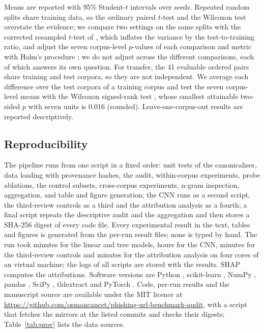 Means are reported with 95\% Student-$t$ intervals over seeds. Repeated random splits share training data, so the ordinary paired $t$-test and the Wilcoxon test overstate the evidence; we compare two settings on the same splits with the corrected resampled $t$-test of \citet{nadeau2003}, which inflates the variance by the test-to-training ratio, and adjust the seven corpus-level $p$-values of each comparison and metric with Holm's procedure \citep{holm1979,demsar2006}; we do not adjust across the different comparisons, each of which answers its own question. For transfer, the 41 evaluable ordered pairs share training and test corpora, so they are not independent. We average each difference over the test corpora of a training corpus and test the seven corpus-level means with the Wilcoxon signed-rank test \citep{wilcoxon1945}, whose smallest attainable two-sided $p$ with seven units is 0.016 (rounded). Leave-one-corpus-out results are reported descriptively.

\subsection{Reproducibility}
\label{sec:repro}
The pipeline runs from one script in a fixed order: unit tests of the canonicaliser, data loading with provenance hashes, the audit, within-corpus experiments, probe ablations, the control subsets, cross-corpus experiments, n-gram inspection, aggregation, and table and figure generation; the CNN runs as a second script, the third-review controls as a third and the attribution analysis as a fourth; a final script repeats the descriptive audit and the aggregation and then stores a SHA-256 digest of every code file. Every experimental result in the text, tables and figures is generated from the per-run result files; none is typed by hand. The run took \RunMinutes{} minutes for the linear and tree models, \CNNHours{} hours for the CNN, \RThreeMinutes{} minutes for the third-review controls and \ShapMinutes{} minutes for the attribution analysis on four cores of an \VerCpu{} virtual machine; the logs of all scripts are stored with the results. SHAP \VerShap{} computes the attributions. Software versions are Python \VerPython{}, scikit-learn \VerSklearn{}, NumPy \VerNumpy{}, pandas \VerPandas{}, SciPy \VerScipy{}, tldextract \VerTldextract{} and PyTorch \VerTorch{}. Code, per-run results and the manuscript source are available under the MIT licence at \url{https://github.com/osmancancet/phishing-url-benchmark-audit}, with a script that fetches the mirrors at the listed commits and checks their digests; Table~\ref{tab:prov} lists the data sources.


